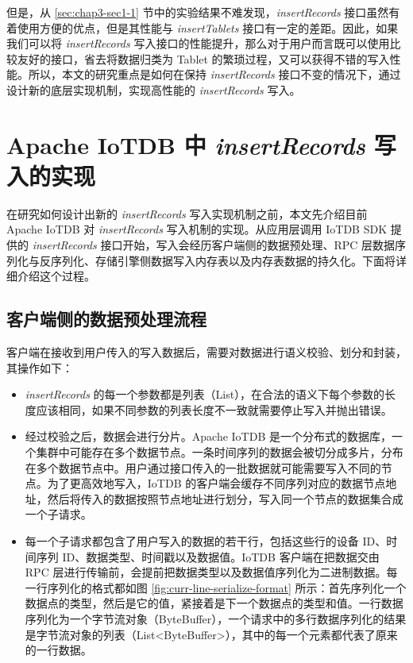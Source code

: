 但是，从 \ref{sec:chap3-sec1-1} 节中的实验结果不难发现，\emph{insertRecords} 接口虽然有着使用方便的优点，但是其性能与 \emph{insertTablets} 接口有一定的差距。因此，如果我们可以将 \emph{insertRecords} 写入接口的性能提升，那么对于用户而言既可以使用比较友好的接口，省去将数据归类为 Tablet 的繁琐过程，又可以获得不错的写入性能。所以，本文的研究重点是如何在保持 \emph{insertRecords} 接口不变的情况下，通过设计新的底层实现机制，实现高性能的 \emph{insertRecords} 写入。


\section{Apache IoTDB 中 \emph{insertRecords} 写入的实现\label{sec:chap3-sec2}}
在研究如何设计出新的 \emph{insertRecords} 写入实现机制之前，本文先介绍目前 Apache IoTDB 对 \emph{insertRecords} 写入机制的实现。从应用层调用 IoTDB SDK 提供的 \emph{insertRecords} 接口开始，写入会经历客户端侧的数据预处理、RPC 层数据序列化与反序列化、存储引擎侧数据写入内存表以及内存表数据的持久化。下面将详细介绍这个过程。
\subsection{客户端侧的数据预处理流程}
客户端在接收到用户传入的写入数据后，需要对数据进行语义校验、划分和封装，其操作如下：
\begin{itemize}
  \item \emph{insertRecords} 的每一个参数都是列表（List），在合法的语义下每个参数的长度应该相同，如果不同参数的列表长度不一致就需要停止写入并抛出错误。
  \item 经过校验之后，数据会进行分片。Apache IoTDB 是一个分布式的数据库，一个集群中可能存在多个数据节点。一条时间序列的数据会被切分成多片，分布在多个数据节点中\cite{wang2023apache}。用户通过接口传入的一批数据就可能需要写入不同的节点。为了更高效地写入，IoTDB 的客户端会缓存不同序列对应的数据节点地址，然后将传入的数据按照节点地址进行划分，写入同一个节点的数据集合成一个子请求。
  \item 每一个子请求都包含了用户写入的数据的若干行，包括这些行的设备 ID、时间序列 ID、数据类型、时间戳以及数据值。IoTDB 客户端在把数据交由 RPC 层进行传输前，会提前把数据类型以及数据值序列化为二进制数据。每一行序列化的格式都如图 \ref{fig:curr-line-serialize-format} 所示：首先序列化一个数据点的类型，然后是它的值，紧接着是下一个数据点的类型和值。一行数据序列化为一个字节流对象（ByteBuffer），一个请求中的多行数据序列化的结果是字节流对象的列表（List<ByteBuffer>），其中的每一个元素都代表了原来的一行数据。
\end{itemize}

